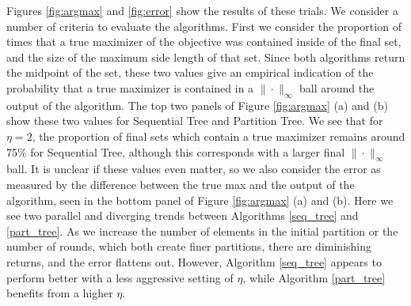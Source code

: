 \documentclass[11pt]{article}
\begin{document}
Figures \ref{fig:argmax} and \ref{fig:error} show the results of these trials. We consider a number of criteria to evaluate the algorithms. First we consider the proportion of times that a true maximizer of the objective was contained inside of the final set, and the size of the maximum side length of that set. Since both algorithms return the midpoint of the set, these two values give an empirical indication of the probability that a true maximizer is contained in a $\|\cdot\|_\infty$ ball around the output of the algorithm. The top two panels of Figure \ref{fig:argmax} (a) and (b) show these two values for Sequential Tree and Partition Tree. We see that for $\eta = 2$, the proportion of final sets which contain a true maximizer remains around 75\% for Sequential Tree, although this corresponds with a larger final $\|\cdot\|_\infty$ ball. It is unclear if these values even matter, so we also consider the error as measured by the difference between the true max and the output of the algorithm, seen in the bottom panel of Figure \ref{fig:argmax} (a) and (b). Here we see two parallel and diverging trends between Algorithms \ref{seq_tree} and \ref{part_tree}. As we increase the number of elements in the initial partition or the number of rounds, which both create finer partitions, there are diminishing returns, and the error flattens out. However, Algorithm \ref{seq_tree} appears to perform better with a less aggressive setting of $\eta$, while Algorithm \ref{part_tree} benefits from a higher $\eta$.
\end{document}
